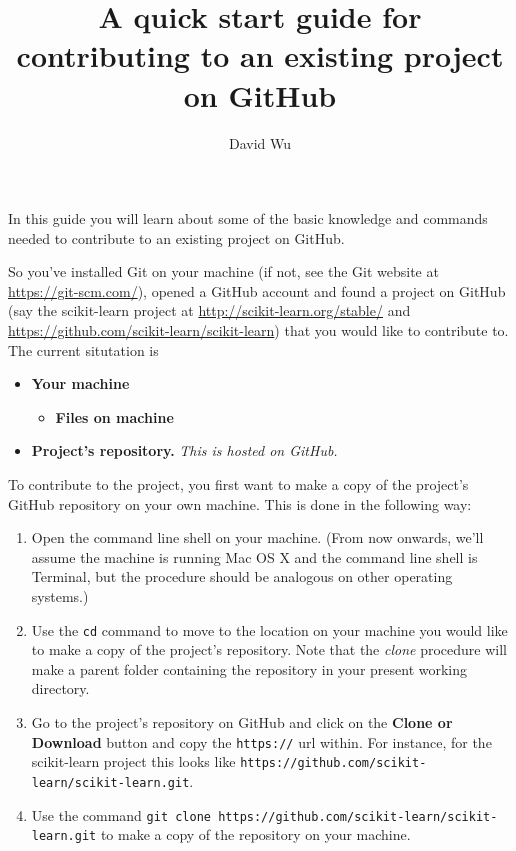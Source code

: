 \documentclass[11pt]{amsart}
\def\code#1{\texttt{#1}}
\begin{document}
\pagestyle{plain}

\title{A quick start guide for contributing to an existing project on GitHub}
\author{David Wu}

\maketitle

In this guide you will learn about some of the basic knowledge and commands needed to contribute to an existing project on GitHub. 

So you've installed Git on your machine (if not, see the Git website at \url{https://git-scm.com/}), opened a GitHub account and found a project on GitHub (say the scikit-learn project at \url{http://scikit-learn.org/stable/} and \url{https://github.com/scikit-learn/scikit-learn}) that you would like to contribute to. The current situtation is
\begin{itemize}
    \item \textbf{Your machine}
    \begin{itemize}
        \item \textbf{Files on machine}
    \end{itemize}
    \item \textbf{Project's repository.} \emph{This is hosted on GitHub.}
\end{itemize}

To contribute to the project, you first want to make a copy of the project's GitHub repository on your own machine. This is done in the following way:
\begin{enumerate}
    \item Open the command line shell on your machine. (From now onwards, we'll assume the machine is running Mac OS X and the command line shell is Terminal, but the procedure should be analogous on other operating systems.)
    \item Use the \code{cd} command to move to the location on your machine you would like to make a copy of the project's repository. Note that the \emph{clone} procedure will make a parent folder containing the repository in your present working directory. 
    \item Go to the project's repository on GitHub and click on the \textbf{Clone or Download} button and copy the \code{https://} url within. For instance, for the scikit-learn project this looks like \code{https://github.com/scikit-learn/scikit-learn.git}.
    \item Use the command \code{git clone https://github.com/scikit-learn/scikit-learn.git} to make a copy of the repository on your machine.
\end{enumerate}
\end{document}
